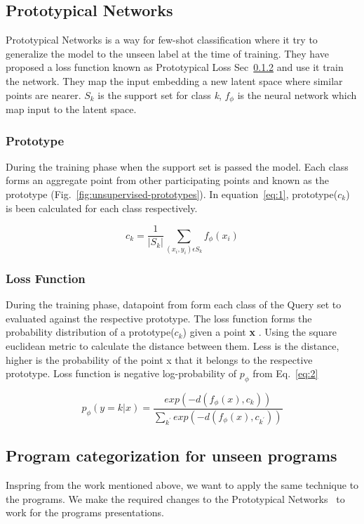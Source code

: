 \subsection{Prototypical Networks}
Prototypical Networks is a way for few-shot classification where it try to generalize the model to the unseen label at the time of training. They have proposed a loss function known as Prototypical Loss Sec~\ref{sec:algo:proto:loss} and use it train the network. They map the input embedding a new latent space where similar points are nearer. $S_{k}$ is the support set for class \textit{k}, $f_{\phi}$ is the neural network which map input to the latent space.

\subsubsection{Prototype}
During the training phase when the support set is passed the model. Each class forms an aggregate point from other participating points and known as the prototype (Fig.~\ref{fig:unsupervised-prototypes}). In equation~\ref{eq:1}, prototype($c_{k}$) is been calculated for each class respectively. 

 
\begin{equation} \label{eq:1}
c_{k} = \frac{1}{|S_{k}|}  \sum_{(x_{i},y_{i}) \epsilon S_{k}}  f_{ \phi }(x_{i})
\end{equation}

\subsubsection{Loss Function}\label{sec:algo:proto:loss}
During the training phase, datapoint from form each class of the Query set to evaluated against the respective prototype. The loss function forms the probability distribution of a prototype($c_{k}$) given a point \textbf{x} . Using the square euclidean metric to calculate the distance between them. Less is the distance, higher  is the probability of the point x that it belongs to the respective prototype. Loss function is negative log-probability of $p_{\phi}$ from Eq.~\ref{eq:2}

\begin{equation}\label{eq:2}
p_{ \phi }(y = k | x) =  \frac{exp(-d(f_{\phi}(x), c_{k}))}{\sum_{k^{'} }exp(-d(f_{\phi}(x), c_{k^{'}}))} 
\end{equation}

\subsection{Program categorization for unseen programs}
Inspring from the work mentioned above, we want to apply the same technique to the programs. We make the required changes to the Prototypical Networks~\cite{protonet:NIPS2017} to work for the programs presentations.  

